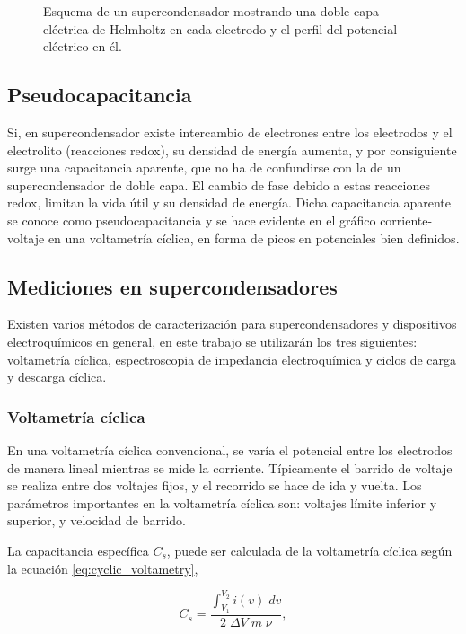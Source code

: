 \begin{figure}[h!]
	\centering
	\caption[Esquema de un supercondensador]{Esquema de un supercondensador mostrando una doble capa eléctrica de Helmholtz en cada electrodo y el perfil del potencial eléctrico en él.}
	\label{fig:edlc}
\end{figure}

\subsection{Pseudocapacitancia}
Si, en supercondensador existe intercambio de electrones entre los electrodos y el electrolito (reacciones redox), su densidad de energía aumenta, y por consiguiente surge una capacitancia aparente, que no ha de confundirse con la de un supercondensador de doble capa. El cambio de fase debido a estas reacciones redox, limitan la vida útil y su densidad de energía\citep{Frackowiak2001}. Dicha capacitancia aparente se conoce como pseudocapacitancia y se hace evidente en el gráfico corriente-voltaje en una voltametría cíclica, en forma de picos en potenciales bien definidos.


\subsection{Mediciones en supercondensadores}
Existen varios métodos de caracterización para supercondensadores y dispositivos electroquímicos en general, en este trabajo se utilizarán los tres siguientes: voltametría cíclica, espectroscopia de impedancia electroquímica y ciclos de carga y descarga cíclica.
\subsubsection{Voltametría cíclica}
En una voltametría cíclica convencional, se varía el potencial entre los electrodos de manera lineal mientras se mide la corriente. Típicamente el barrido de voltaje se realiza entre dos voltajes fijos, y el recorrido se hace de ida y vuelta. Los parámetros importantes en la voltametría cíclica son: voltajes límite inferior y superior, y velocidad de barrido.

La capacitancia específica $C_s$, puede ser calculada de la voltametría cíclica según la ecuación \ref{eq:cyclic_voltametry},

\begin{equation}\label{eq:cyclic_voltametry}
	C_{s} = \frac{\int_{V_1}^{V_2}i(v) \; dv}{2 \; \Delta V \; m \; \nu },
\end{equation}

